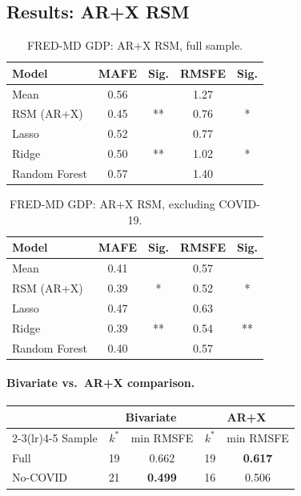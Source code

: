 \documentclass[12pt,a4paper]{article}
\begin{document}
\subsection{Results: AR+X RSM}

\begin{table}[h]
\centering
\caption{FRED-MD GDP: AR+X RSM, full sample.}
\label{tab:gdp_arx_full}
\begin{tabular}{lcccc}
\toprule
Model & MAFE & Sig. & RMSFE & Sig. \\
\midrule
Mean           & 0.56 &     & 1.27 &     \\
RSM (AR+X)     & 0.45 & **  & 0.76 & *   \\
Lasso          & 0.52 &     & 0.77 &     \\
Ridge          & 0.50 & **  & 1.02 & *   \\
Random Forest  & 0.57 &     & 1.40 &     \\
\bottomrule
\end{tabular}
\end{table}

\begin{table}[h]
\centering
\caption{FRED-MD GDP: AR+X RSM, excluding COVID-19.}
\label{tab:gdp_arx_nocov}
\begin{tabular}{lcccc}
\toprule
Model & MAFE & Sig. & RMSFE & Sig. \\
\midrule
Mean           & 0.41 &     & 0.57 &     \\
RSM (AR+X)     & 0.39 & *   & 0.52 & *   \\
Lasso          & 0.47 &     & 0.63 &     \\
Ridge          & 0.39 & **  & 0.54 & **  \\
Random Forest  & 0.40 &     & 0.57 &     \\
\bottomrule
\end{tabular}
\end{table}

\paragraph{Bivariate vs.\ AR+X comparison.}
\begin{center}
\begin{tabular}{lcccc}
\toprule
 & \multicolumn{2}{c}{Bivariate} & \multicolumn{2}{c}{AR+X} \\
\cmidrule(lr){2-3}\cmidrule(lr){4-5}
Sample & $k^*$ & min RMSFE & $k^*$ & min RMSFE \\
\midrule
Full    & 19 & 0.662 & 19 & \textbf{0.617} \\
No-COVID & 21 & \textbf{0.499} & 16 & 0.506 \\
\bottomrule
\end{tabular}
\end{center}
\end{document}
